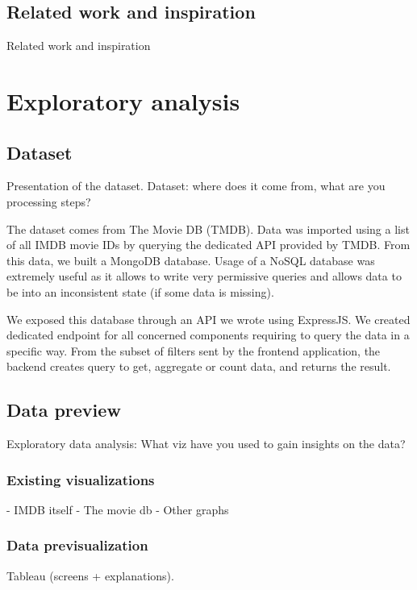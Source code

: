 \documentclass[a4paper,10pt]{article}
\begin{document}
\subsection{Related work and inspiration}

Related work and inspiration

\section{Exploratory analysis}

\subsection{Dataset}

Presentation of the dataset.
Dataset: where does it come from, what are you processing steps?

The dataset comes from The Movie DB (TMDB). Data was imported
using a list of all IMDB movie IDs by querying the dedicated API provided by TMDB.
From this data, we built a MongoDB database. Usage of a NoSQL database was extremely
useful as it allows to write very permissive queries and allows data to be into
an inconsistent state (if some data is missing).

We exposed this database through an API we wrote using ExpressJS. We created dedicated
endpoint for all concerned components requiring to query the data in a specific way.
From the subset of filters sent by the frontend application, the backend creates
query to get, aggregate or count data, and returns the result.

\subsection{Data preview}

Exploratory data analysis: What viz have you used to gain insights on the data?

\subsubsection{Existing visualizations}

- IMDB itself
- The movie db
- Other graphs

\subsubsection{Data previsualization}

Tableau (screens + explanations).
\end{document}
